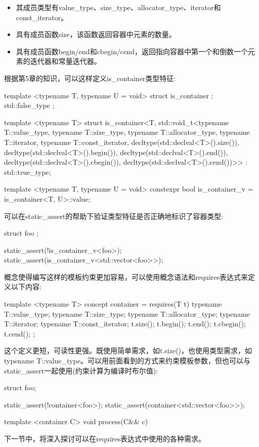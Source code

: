 \begin{itemize}
\item
其成员类型有value\_type、size\_type、allocator\_type、iterator和const\_iterator。

\item
具有成员函数size，该函数返回容器中元素的数量。

\item
具有成员函数begin/end和cbegin/cend，返回指向容器中第一个和倒数一个元素的迭代器和常量迭代器。
\end{itemize}

根据第5章的知识，可以这样定义is\_container类型特征:

\begin{cpp}
template <typename T, typename U = void>
struct is_container : std::false_type {};

template <typename T>
struct is_container<T,
	std::void_t<typename T::value_type,
				typename T::size_type,
				typename T::allocator_type,
				typename T::iterator,
				typename T::const_iterator,
				decltype(std::declval<T>().size()),
				decltype(std::declval<T>().begin()),
				decltype(std::declval<T>().end()),
				decltype(std::declval<T>().cbegin()),
				decltype(std::declval<T>().cend())>>
	: std::true_type{};

template <typename T, typename U = void>
constexpr bool is_container_v = is_container<T, U>::value;
\end{cpp}

可以在static\_assert的帮助下验证类型特征是否正确地标识了容器类型:

\begin{cpp}
struct foo {};

static_assert(!is_container_v<foo>);
static_assert(is_container_v<std::vector<foo>>);
\end{cpp}

概念使得编写这样的模板约束更加容易，可以使用概念语法和requires表达式来定义以下内容:

\begin{cpp}
template <typename T>
concept container = requires(T t)
{
	typename T::value_type;
	typename T::size_type;
	typename T::allocator_type;
	typename T::iterator;
	typename T::const_iterator;
	t.size();
	t.begin();
	t.end();
	t.cbegin();
	t.cend();
};
\end{cpp}

这个定义更短，可读性更强。既使用简单需求，如t.size()，也使用类型需求，如typename T::value\_type。可以用前面看到的方式来约束模板参数，但也可以与static\_assert一起使用(约束计算为编译时布尔值):

\begin{cpp}
struct foo{};

static_assert(!container<foo>);
static_assert(container<std::vector<foo>>);

template <container C>
void process(C&& c) {}
\end{cpp}

下一节中，将深入探讨可以在requires表达式中使用的各种需求。


























